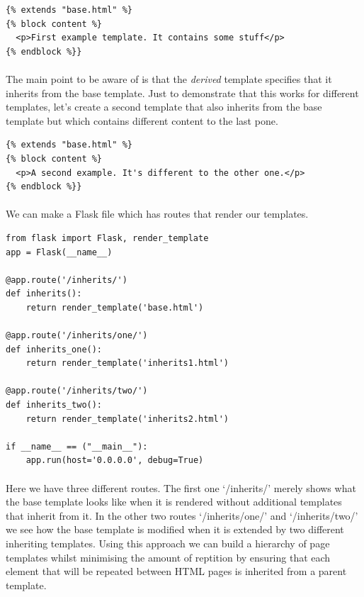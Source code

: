 \documentclass[12pt, a4paper, twoside]{book}
\begin{document}
\begin{lstlisting}
{% extends "base.html" %}
{% block content %}
  <p>First example template. It contains some stuff</p>
{% endblock %}}
\end{lstlisting}

\paragraph{} The main point to be aware of is that the \emph{derived} template specifies that it inherits from the base template. Just to demonstrate that this works for different templates, let's create a second template that also inherits from the base template but which contains different content to the last pone.

\begin{lstlisting}
{% extends "base.html" %}
{% block content %}
  <p>A second example. It's different to the other one.</p>
{% endblock %}}
\end{lstlisting}

\paragraph{} We can make a Flask file which has routes that render our templates.

\begin{lstlisting}
from flask import Flask, render_template
app = Flask(__name__)

@app.route('/inherits/')
def inherits():
    return render_template('base.html')

@app.route('/inherits/one/')
def inherits_one():
    return render_template('inherits1.html')

@app.route('/inherits/two/')
def inherits_two():
    return render_template('inherits2.html')

if __name__ == ("__main__"):
    app.run(host='0.0.0.0', debug=True)
\end{lstlisting}

\paragraph{} Here we have three different routes. The first one `/inherits/' merely shows what the base template looks like when it is rendered without additional templates that inherit from it. In the other two routes `/inherits/one/' and `/inherits/two/' we see how the base template is modified when it is extended by two different inheriting templates. Using this approach we can build a hierarchy of page templates whilst minimising the amount of reptition by ensuring that each element that will be repeated between HTML pages is inherited from a parent template.
\end{document}
